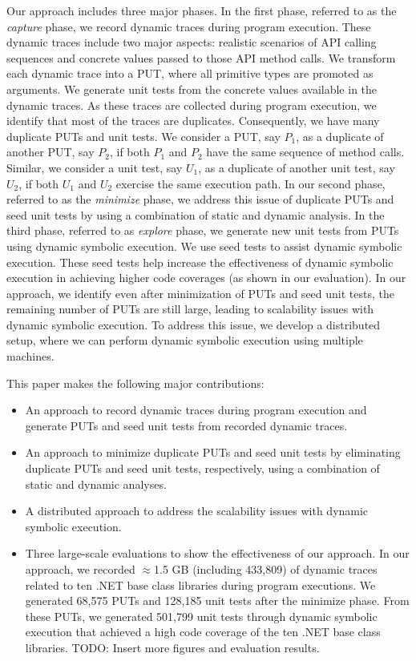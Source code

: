 Our approach includes three major phases. In the first phase, referred to as the \emph{capture} phase,
we record dynamic traces during program execution. These dynamic traces include two major aspects: realistic scenarios
of API calling sequences and concrete values passed to those API method calls. 
We transform each dynamic trace into a PUT, where all primitive types are promoted as
arguments. We generate unit tests from the concrete values available in the dynamic traces.
As these traces are collected during program execution, we identify that most of the traces are duplicates.
Consequently, we have many duplicate PUTs and unit tests. We consider a PUT, say $P_1$, as a duplicate
of another PUT, say $P_2$, if both $P_1$ and $P_2$ have the same sequence of method calls. Similar,
we consider a unit test, say $U_1$, as a duplicate of another unit test, say $U_2$, if both $U_1$
and $U_2$ exercise the same execution path. In our second phase, referred to as the \emph{minimize}
phase, we address this issue of duplicate PUTs and seed unit tests by using a combination of static
and dynamic analysis. In the third phase, referred to as \emph{explore} phase, we generate new unit
tests from PUTs using dynamic symbolic execution. We use seed tests to assist dynamic symbolic
execution. These seed tests help increase the effectiveness of dynamic symbolic execution in 
achieving higher code coverages (as shown in our evaluation). In our approach, we identify
even after minimization of PUTs and seed unit tests, the remaining number of PUTs are
still large, leading to scalability issues with dynamic symbolic execution. To address this issue,
we develop a distributed setup, where we can perform dynamic symbolic execution using multiple
machines.



This paper makes the following major contributions:

\begin{itemize}

\item An approach to record dynamic traces during program execution and generate PUTs and seed
unit tests from recorded dynamic traces.
\item An approach to minimize duplicate PUTs and seed unit tests by eliminating duplicate
PUTs and seed unit tests, respectively, using a combination of static and dynamic analyses.
\item A distributed approach to address the scalability issues with dynamic symbolic execution.
\item Three large-scale evaluations to show the effectiveness of our approach. 
In our approach, we recorded $\approx$1.5 GB (including 433,809) of dynamic traces related
to ten .NET base class libraries during program executions. 
We generated 68,575 PUTs and 128,185 unit tests after the minimize phase. From these PUTs,
we generated 501,799 unit tests through dynamic symbolic execution that achieved a
high code coverage of the ten .NET base class libraries. TODO: Insert more figures
and evaluation results.
\end{itemize}





